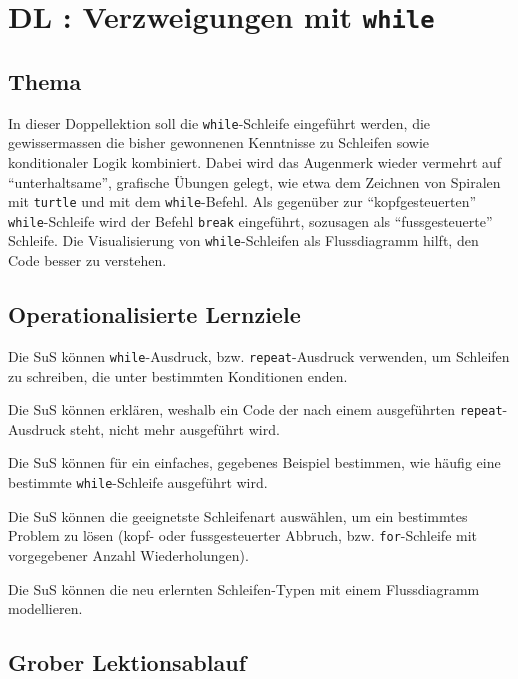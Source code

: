 \section{DL \themycounter: Verzweigungen mit \texorpdfstring{\lstinline|while|}{while}}
\begin{myExBox}[title=DL \themycounter]
\subsection*{Thema}
In dieser Doppellektion soll die \lstinline|while|-Schleife eingeführt werden, die gewissermassen die bisher gewonnenen Kenntnisse zu Schleifen sowie konditionaler Logik kombiniert. Dabei wird das Augenmerk wieder vermehrt auf ``unterhaltsame'', grafische Übungen gelegt, wie etwa dem Zeichnen von Spiralen mit \lstinline|turtle| und mit dem \lstinline|while|-Befehl. Als gegenüber zur ``kopfgesteuerten'' \lstinline|while|-Schleife wird der Befehl \lstinline|break| eingeführt, sozusagen als ``fussgesteuerte'' Schleife. Die Visualisierung von \lstinline|while|-Schleifen als Flussdiagramm hilft, den Code besser zu verstehen.

\subsection*{Operationalisierte Lernziele}
\begin{todolist}
    \item Die SuS können \lstinline|while|-Ausdruck, bzw. \lstinline|repeat|-Ausdruck verwenden, um Schleifen zu schreiben, die unter bestimmten Konditionen enden.
    \item Die SuS können erklären, weshalb ein Code der nach einem ausgeführten \lstinline|repeat|-Ausdruck steht, nicht mehr ausgeführt wird.
    \item Die SuS können für ein einfaches, gegebenes Beispiel bestimmen, wie häufig eine bestimmte \lstinline|while|-Schleife ausgeführt wird.
    \item Die SuS können die geeignetste Schleifenart auswählen, um ein bestimmtes Problem zu lösen (kopf- oder fussgesteuerter Abbruch, bzw. \lstinline|for|-Schleife mit vorgegebener Anzahl Wiederholungen).
    \item Die SuS können die neu erlernten Schleifen-Typen mit einem Flussdiagramm modellieren.
\end{todolist}

\subsection*{Grober Lektionsablauf}


\end{myExBox}
